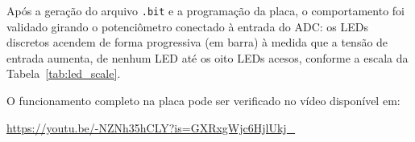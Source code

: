 \documentclass[12pt,a4paper]{article}
\begin{document}
Após a geração do arquivo \texttt{.bit} e a programação da placa, o comportamento foi
validado girando o potenciômetro conectado à entrada do ADC: os LEDs discretos acendem de
forma progressiva (em barra) à medida que a tensão de entrada aumenta, de nenhum LED até os
oito LEDs acesos, conforme a escala da Tabela~\ref{tab:led_scale}.

O funcionamento completo na placa pode ser verificado no vídeo disponível em:
\begin{center}
    \url{https://youtu.be/-NZNh35hCLY?is=GXRxgWjc6HjlUkj_}
\end{center}
\end{document}
